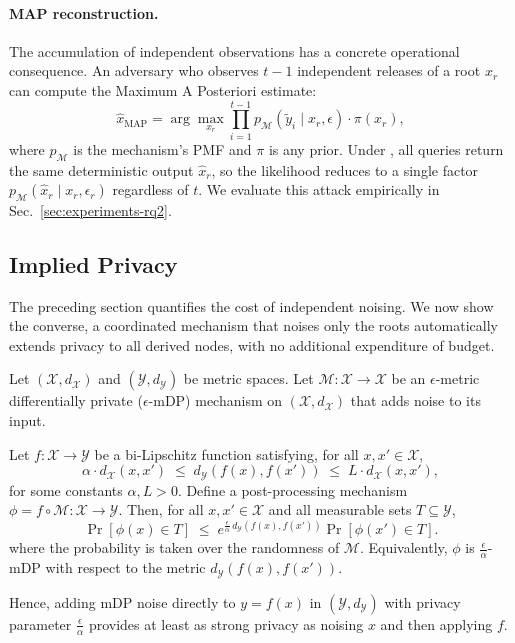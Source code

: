 \paragraph{MAP reconstruction.} The accumulation of independent observations has a concrete operational consequence. An adversary who observes $t-1$ independent releases of a root $x_r$ can compute the Maximum A Posteriori estimate:
\[
    \hat{x}_{\mathrm{MAP}} = \arg\max_{x_r} \prod_{i=1}^{t-1} p_{\mathcal{M}}(\tilde{y}_i \mid x_r, \epsilon) \cdot \pi(x_r),
\]
where $p_{\mathcal{M}}$ is the mechanism's PMF and $\pi$ is any prior. Under \sysname{}, all queries return the same deterministic output $\hat{x}_r$, so the likelihood reduces to a single factor $p_{\mathcal{M}}(\hat{x}_r \mid x_r, \epsilon_r)$ regardless of $t$. We evaluate this attack empirically in Sec.~\ref{sec:experiments-rq2}.

 


\subsection{Implied Privacy} The preceding section quantifies the cost of independent noising. We now show the converse, a coordinated mechanism that noises only the roots automatically extends privacy to all derived nodes, with no additional expenditure of budget.

\begin{theorem}
\label{thm:implied-privacy}
Let $(\mathcal{X}, d_{\mathcal{X}})$ and $(\mathcal{Y}, d_{\mathcal{Y}})$ be metric spaces. 
Let $\mathcal{M}: \mathcal{X} \to \mathcal{X}$ be an $\epsilon$-metric differentially private ($\epsilon$-mDP) mechanism on $(\mathcal{X}, d_{\mathcal{X}})$ that adds noise to its input.

Let $f: \mathcal{X} \to \mathcal{Y}$ be a bi-Lipschitz function satisfying, for all $x, x' \in \mathcal{X}$,
\[
    \alpha \cdot d_{\mathcal{X}}(x, x') 
    \;\leq\; d_{\mathcal{Y}}(f(x), f(x')) 
    \;\leq\; L \cdot d_{\mathcal{X}}(x, x') ,
\]
for some constants $\alpha, L > 0$. Define a post-processing mechanism $\phi = f \circ \mathcal{M} : \mathcal{X} \to \mathcal{Y}.$ Then, for all $x, x' \in \mathcal{X}$ and all measurable sets $T \subseteq \mathcal{Y}$,
\[
    \Pr[\phi(x) \in T]
    \;\leq\;
    e^{\frac{\epsilon}{\alpha} \, d_{\mathcal{Y}}(f(x), f(x'))}
    \Pr[\phi(x') \in T].
\]
where the probability is taken over the randomness of $\mathcal{M}$. Equivalently, $\phi$ is $\frac{\epsilon}{\alpha}$-mDP with respect to the metric $d_{\mathcal{Y}}(f(x), f(x'))$.

Hence, adding mDP noise directly to $y = f(x)$ in $(\mathcal{Y}, d_{\mathcal{Y}})$ with privacy parameter $\frac{\epsilon}{\alpha}$ provides at least as strong privacy as noising $x$ and then applying $f$.
\end{theorem}

